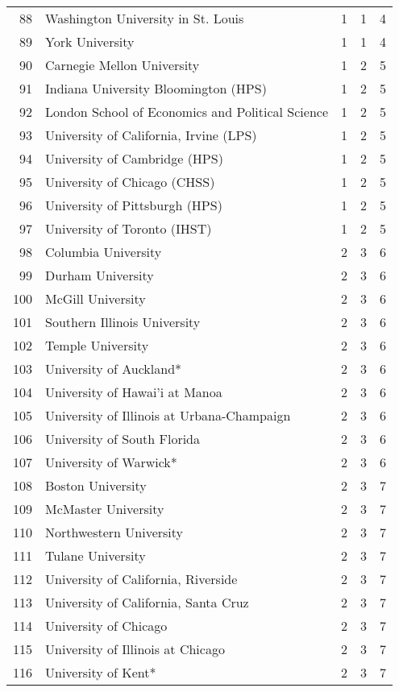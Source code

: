 \begin{longtable}{rllll}
  88 & Washington University in St. Louis & 1 & 1 & 4 \\ 
  89 & York University & 1 & 1 & 4 \\ 
  90 & Carnegie Mellon University & 1 & 2 & 5 \\ 
  91 & Indiana University Bloomington (HPS) & 1 & 2 & 5 \\ 
  92 & London School of Economics and Political Science & 1 & 2 & 5 \\ 
  93 & University of California, Irvine (LPS) & 1 & 2 & 5 \\ 
  94 & University of Cambridge (HPS) & 1 & 2 & 5 \\ 
  95 & University of Chicago (CHSS) & 1 & 2 & 5 \\ 
  96 & University of Pittsburgh (HPS) & 1 & 2 & 5 \\ 
  97 & University of Toronto (IHST) & 1 & 2 & 5 \\ 
  98 & Columbia University & 2 & 3 & 6 \\ 
  99 & Durham University & 2 & 3 & 6 \\ 
  100 & McGill University & 2 & 3 & 6 \\ 
  101 & Southern Illinois University & 2 & 3 & 6 \\ 
  102 & Temple University & 2 & 3 & 6 \\ 
  103 & University of Auckland* & 2 & 3 & 6 \\ 
  104 & University of Hawai'i at Manoa & 2 & 3 & 6 \\ 
  105 & University of Illinois at Urbana-Champaign & 2 & 3 & 6 \\ 
  106 & University of South Florida & 2 & 3 & 6 \\ 
  107 & University of Warwick* & 2 & 3 & 6 \\ 
  108 & Boston University & 2 & 3 & 7 \\ 
  109 & McMaster University & 2 & 3 & 7 \\ 
  110 & Northwestern University & 2 & 3 & 7 \\ 
  111 & Tulane University & 2 & 3 & 7 \\ 
  112 & University of California, Riverside & 2 & 3 & 7 \\ 
  113 & University of California, Santa Cruz & 2 & 3 & 7 \\ 
  114 & University of Chicago & 2 & 3 & 7 \\ 
  115 & University of Illinois at Chicago & 2 & 3 & 7 \\ 
  116 & University of Kent* & 2 & 3 & 7 \\ 

\end{longtable}
